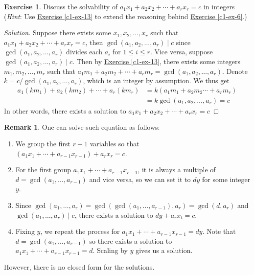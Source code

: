 \documentclass{article}
\theoremstyle{definition}
\newtheorem{exercise}{Exercise}
\newtheorem{remark}{Remark}[exercise]
\begin{document}
\begin{exercise}
Discuss the solvability of $a_1 x_1 + a_2 x_2 + \cdots + a_r x_r = c$ in integers (\textit{Hint}: Use \hyperref[c1-ex-13]{Exercise \ref*{c1-ex-13}} to extend the reasoning behind \hyperref[c1-ex-6]{Exercise \ref*{c1-ex-6}}.)
\end{exercise}
\begin{proof}[Solution]
Suppose there exists some $x_1, x_2, \hdots, x_r$ such that $a_1 x_1 + a_2 x_2 + \cdots + a_r x_r = c$, then $\gcd(a_1, a_2, \hdots, a_r) \mid c$ since $\gcd(a_1, a_2, \hdots, a_r)$ divides each $a_i$ for $1 \leq i \leq r$. Vice versa, suppose $\gcd(a_1, a_2, \hdots, a_r) \mid c$. Then by \hyperref[c1-ex-13]{Exercise \ref*{c1-ex-13}}, there exists some integers $m_1, m_2, \hdots, m_r$ such that $a_1 m_1 + a_2 m_2 + \cdots + a_r m_r = \gcd(a_1, a_2, \hdots, a_r)$. Denote $k = c/\gcd(a_1, a_2, \hdots, a_r)$, which is an integer by assumption. We thus get
\begin{align*}
a_1 (k m_1) + a_2 (k m_2) + \cdots + a_r (k m_r) & = k (a_1 m_1 + a_2 m_2 \cdots + a_r m_r) \\
& = k \gcd(a_1, a_2, \hdots, a_r) = c
\end{align*}
In other words, there exists a solution to $a_1 x_1 + a_2 x_2 + \cdots + a_r x_r = c$
\end{proof}
\begin{remark}
One can solve such equation as follows:
\begin{enumerate}
	\item We group the first $r - 1$ variables so that $(a_1 x_1 + \cdots + a_{r - 1} x_{r - 1}) + a_r x_r = c$.
	\item For the first group $a_1 x_1 + \cdots + a_{r - 1} x_{r - 1}$, it is always a multiple of $d = \gcd(a_1, \hdots, a_{r - 1})$ and vice versa, so we can set it to $d y$ for some integer $y$.
	\item Since $\gcd(a_1, \hdots, a_r) = \gcd(\gcd(a_1, \hdots, a_{r - 1}), a_r) = \gcd(d, a_r)$ and $\gcd(a_1, \hdots, a_r) \mid c$, there exists a solution to $dy + a_r x_t = c$.
	\item Fixing $y$, we repeat the process for $a_1 x_1 + \cdots + a_{r - 1} x_{r - 1} = dy$. Note that $d = \gcd(a_1, \hdots, a_{r - 1})$ so there exists a solution to $a_1 x_1 + \cdots + a_{r - 1} x_{r - 1} = d$. Scaling by $y$ gives us a solution.
\end{enumerate}
However, there is no closed form for the solutions.
\end{remark}
\end{document}
